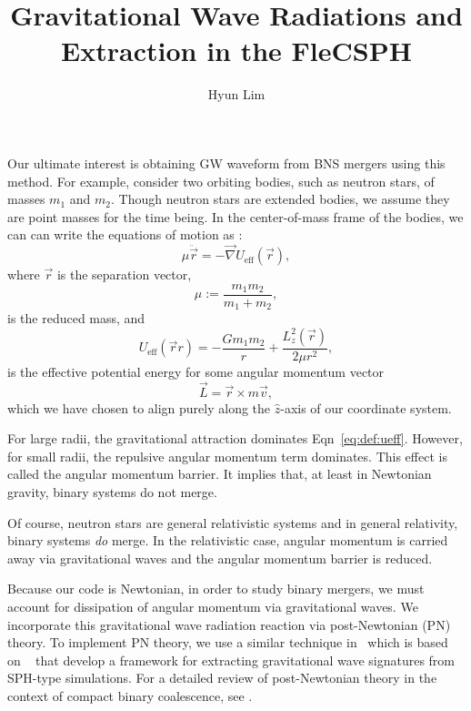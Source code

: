 \documentclass{article}
\newcommand{\myvec}[1]{\vec{#1}}
\begin{document}
\title{Gravitational Wave Radiations and Extraction in the FleCSPH}

\author{Hyun Lim}

\maketitle

Our ultimate interest is obtaining GW waveform from BNS mergers using this method.
For example, consider two orbiting bodies, such as neutron stars, of masses $m_1$
and $m_2$. Though neutron stars are extended bodies, we assume
  they are point masses for the time being. In the center-of-mass
frame of the bodies, we can can write the equations of motion as
\cite{Goldstein}:
\begin{equation}
  \label{eq:gw:eom:com}
  \mu\ddot{\myvec{r}} = -\myvec{\nabla} U_{\text{eff}}(\myvec{r}),
\end{equation}
where $\myvec{r}$ is the separation vector, 
\begin{equation}
  \label{eq:def:com}
  \mu := \frac{m_1 m_2}{m_1+m_2},
\end{equation}
is the reduced mass, and 
\begin{equation}
  \label{eq:def:ueff}
  U_{\text{eff}}(\myvec{r}r) = - \frac{Gm_1m_2}{r} + \frac{L_z^2(\myvec{r})}{2\mu r^2},
\end{equation}
is the effective potential energy for some angular momentum vector
$$\myvec{L}=\myvec{r}\times m \myvec{v},$$
which we have chosen to align purely along the
$\hat{z}$-axis of our coordinate system.

For large radii, the gravitational attraction dominates Eqn~\ref{eq:def:ueff}. 
However, for small radii, the repulsive
angular momentum term dominates. This effect is called the
angular momentum barrier. It implies that, at least in
Newtonian gravity, binary systems do not merge.

Of course, neutron stars are general relativistic systems and in
general relativity, binary systems \textit{do} merge. In the
relativistic case, angular momentum is carried away via gravitational
waves and the angular momentum barrier is reduced. 

Because our code is Newtonian, in order to study binary mergers, 
we must account for dissipation of angular momentum via gravitational waves. We
incorporate this gravitational wave radiation reaction via
post-Newtonian (PN) theory. 
To implement PN theory, we use a similar
technique in~\cite{ZhugeCoalesceGW} which is based on
~\cite{FinnEvansDetermining,CentrellaMcMillanGW} 
that develop a
framework for extracting gravitational wave signatures from SPH-type
simulations. For a detailed review of post-Newtonian theory in the
context of compact binary coalescence, see
\cite{blanchet2006gravitational}.
\end{document}
